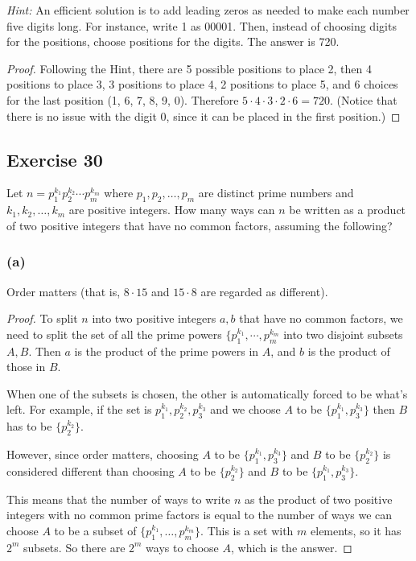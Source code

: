 \documentclass[14pt]{extarticle}
\begin{document}
{\it Hint:} An efficient solution is to add leading zeros as needed to make each number five digits long. For 
instance, write 1 as 00001. Then, instead of choosing digits for the positions, choose positions for the digits. 
The answer is 720.

\begin{proof}
Following the Hint, there are 5 possible positions to place 2, then 4 positions to place 3, 3 positions to place 4, 2
positions to place 5, and 6 choices for the last position (1, 6, 7, 8, 9, 0). Therefore \(5 \cdot 4 \cdot 3 \cdot 2
\cdot 6 = 720\). (Notice that there is no issue with the digit 0, since it can be placed in the first position.)
\end{proof}

\subsection{Exercise 30}
Let \(n = p_1^{k_1} p_2^{k_2} \cdots p_m^{k_m}\) where \(p_1, p_2, \ldots, p_m\) are distinct prime numbers and 
\(k_1, k_2, \ldots, k_m\) are positive integers. How many ways can $n$ be written as a product of two positive 
integers that have no common factors, assuming the following?

\subsubsection{(a)}
Order matters (that is, \(8 \cdot 15\) and \(15 \cdot 8\) are regarded as different).

\begin{proof}
To split $n$ into two positive integers $a, b$ that have no common factors, we need to split the set of all the prime 
powers \(\{p_1^{k_1}, \cdots, p_m^{k_m}\) into two disjoint subsets $A, B$. Then $a$ is the product of the prime powers in $A$, and $b$ is the product of those in $B$.

When one of the subsets is chosen, the other is automatically forced to be what's left. For example, if the
set is \(p_1^{k_1}, p_2^{k_2}, p_3^{k_3}\) and we choose $A$ to be \(\{p_1^{k_1}, p_3^{k_3}\}\) then $B$ has to be
\(\{p_2^{k_2}\}\).

However, since order matters, choosing $A$ to be \(\{p_1^{k_1}, p_3^{k_3}\}\) and $B$ to be \(\{p_2^{k_2}\}\) 
is considered different than choosing $A$ to be \(\{p_2^{k_2}\}\) and $B$ to be \(\{p_1^{k_1}, p_3^{k_3}\}\).

This means that the number of ways to write $n$ as the product of two positive integers with no common prime 
factors is equal to the number of ways we can choose $A$ to be a subset of \(\{p_1^{k_1}, \ldots, p_m^{k_m}\}\). This 
is a set with $m$ elements, so it has $2^m$ subsets. So there are $2^m$ ways to choose $A$, which is the answer.
\end{proof}
\end{document}
